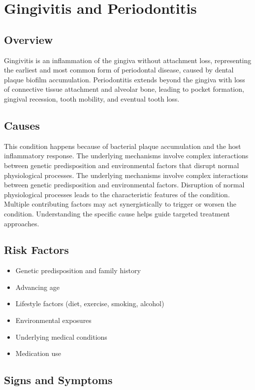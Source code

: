 \chapter{Gingivitis and Periodontitis}
\label{sec:Gingivitis and Periodontitis}

\section{Overview}
Gingivitis is an inflammation of the gingiva without attachment loss, representing the earliest and most common form of periodontal disease, caused by dental plaque biofilm accumulation. Periodontitis extends beyond the gingiva with loss of connective tissue attachment and alveolar bone, leading to pocket formation, gingival recession, tooth mobility, and eventual tooth loss.
\section{Causes}
This condition happens because of bacterial plaque accumulation and the host inflammatory response. The underlying mechanisms involve complex interactions between genetic predisposition and environmental factors that disrupt normal physiological processes. The underlying mechanisms involve complex interactions between genetic predisposition and environmental factors. Disruption of normal physiological processes leads to the characteristic features of the condition. Multiple contributing factors may act synergistically to trigger or worsen the condition. Understanding the specific cause helps guide targeted treatment approaches.
\section{Risk Factors}


\begin{itemize}[noitemsep]
  \item Genetic predisposition and family history
  \item Advancing age
  \item Lifestyle factors (diet, exercise, smoking, alcohol)
  \item Environmental exposures
  \item Underlying medical conditions
  \item Medication use
\end{itemize}
\section{Signs and Symptoms}

